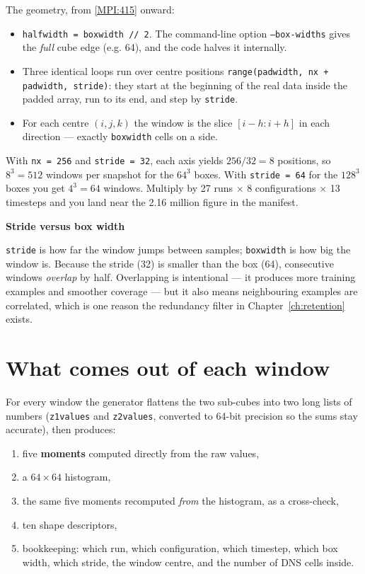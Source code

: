 \documentclass[11pt,a4paper]{report}
\newcommand{\srcbase}{vscode://file/Users/syellapa/Documents/Research/2026/ANSYS/Multi-ScalarPDF}
\newcommand{\srctag}[1]{{\footnotesize\textcolor{TagGray}{[#1]}}}
\newcommand{\MpiL}[1]{\href{\srcbase/EnsightPDFHybridDatasetMPI.py:#1}{\srctag{MPI:#1}}}
\newcommand{\code}[1]{\texttt{#1}}
\newcommand{\term}[1]{\textbf{#1}}
\renewcommand{\_}{\origtextunderscore\allowbreak}
\newlength{\calloutwidth}
\newcommand{\calloutOpen}{%
  \par\medskip\noindent
  \setlength{\calloutwidth}{\dimexpr\linewidth-2\fboxsep\relax}%
  \begin{lrbox}{\calloutbox}\begin{minipage}{\calloutwidth}}
\newcommand{\calloutClose}[1]{%
  \end{minipage}\end{lrbox}\colorbox{#1}{\usebox{\calloutbox}}\par\medskip}
\newenvironment{plainbox}[1]
  {\calloutOpen\textbf{#1}\par\medskip}
  {\calloutClose{BoxBG}}
\begin{document}
The geometry, from \MpiL{415} onward:

\begin{itemize}
  \item \code{half\_width = box\_width // 2}. The command-line option \code{--box-widths}
        gives the \emph{full} cube edge (e.g. 64), and the code halves it internally.
  \item Three identical loops run over centre positions
        \code{range(pad\_width, nx + pad\_width, stride)}: they start at the beginning of the
        real data inside the padded array, run to its end, and step by \code{stride}.
  \item For each centre $(i, j, k)$ the window is the slice
        $[i-h : i+h]$ in each direction --- exactly \code{box\_width} cells on a side.
\end{itemize}

With \code{nx = 256} and \code{stride = 32}, each axis yields $256/32 = 8$ positions, so
$8^3 = 512$ windows per snapshot for the $64^3$ boxes. With \code{stride = 64} for the
$128^3$ boxes you get $4^3 = 64$ windows. Multiply by 27 runs $\times$ 8 configurations
$\times$ 13 timesteps and you land near the 2.16 million figure in the manifest.

\begin{plainbox}{Stride versus box width}
\code{stride} is how far the window jumps between samples; \code{box\_width} is how big the
window is. Because the stride (32) is smaller than the box (64), consecutive windows
\emph{overlap} by half. Overlapping is intentional --- it produces more training examples and
smoother coverage --- but it also means neighbouring examples are correlated, which is one
reason the redundancy filter in Chapter~\ref{ch:retention} exists.
\end{plainbox}

\section{What comes out of each window}

For every window the generator flattens the two sub-cubes into two long lists of numbers
(\code{z1\_values} and \code{z2\_values}, converted to 64-bit precision so the sums stay
accurate), then produces:

\begin{enumerate}
  \item five \term{moments} computed directly from the raw values,
  \item a $64\times64$ histogram,
  \item the same five moments recomputed \emph{from} the histogram, as a cross-check,
  \item ten shape descriptors,
  \item bookkeeping: which run, which configuration, which timestep, which box width,
        which stride, the window centre, and the number of DNS cells inside.
\end{enumerate}
\end{document}
